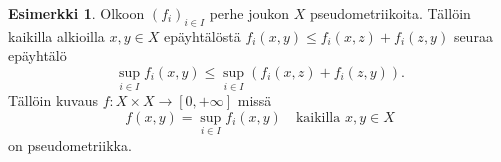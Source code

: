 \documentclass[12pt,a4paper,leqno]{report}
\theoremstyle{plain}
\theoremstyle{definition}
\newtheorem{esim}[equation]{Esimerkki}
\theoremstyle{remark}
\begin{document}
\begin{esim}%
\label{pseudometriikkaperheen sup}
Olkoon $(f_i)_{i\in I}$ perhe joukon $X$ pseudometriikoita. 
Tällöin kaikilla alkioilla $x,y\in X$ epäyhtälöstä 
$f_i(x,y)\leq f_i(x,z)+f_i(z,y)$ seuraa epäyhtälö 
$$\sup_{i\in I}f_i(x,y)\leq \sup_{i\in I}\left(f_i(x,z)+f_i(z,y)\right).$$
Tällöin kuvaus 
$f\colon X\times X\rightarrow [0,+\infty]$
 missä  
\begin{equation*}
f(x,y)=\sup_{i\in I}f_i(x,y)
\quad\text{kaikilla }x,y\in X 
\end{equation*} 
on pseudometriikka. 
\end{esim}
\end{document}
